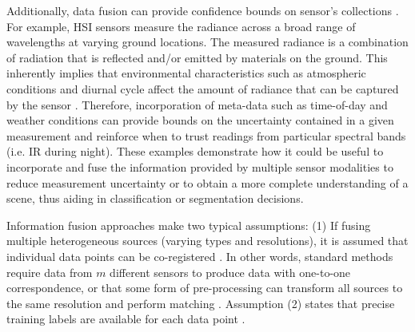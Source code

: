 	
	Additionally, data fusion can provide confidence bounds on sensor's collections \cite{hackett1990multisensorfusion,Mohandes2018ClassifierCombinationTechniquesReview}.  For example, HSI sensors measure the radiance across a broad range of wavelengths at varying ground locations.  The measured radiance is a combination of radiation that is reflected and/or emitted by materials on the ground.  This inherently implies that environmental characteristics such as atmospheric conditions and diurnal cycle affect the amount of radiance that can be captured by the sensor \cite{Zare2008Thesis}.  Therefore, incorporation of meta-data such as time-of-day and weather conditions can provide bounds on the uncertainty contained in a given measurement and reinforce when to trust readings from particular spectral bands (i.e. IR during night).   These examples demonstrate how it could be useful to incorporate and fuse the information provided by multiple sensor modalities to reduce measurement uncertainty or to obtain a more complete understanding of a scene, thus aiding in classification or segmentation decisions.
	\newline
	
	Information fusion approaches make two typical assumptions: (1) If fusing multiple heterogeneous sources (varying types and resolutions), it is assumed that individual data points can be co-registered \cite{Shen2016SpatioTemporalSpectralFusion}. In other words, standard methods require data from $m$ different sensors to produce data with one-to-one correspondence, or that some form of pre-processing can transform all sources to the same resolution and perform matching \cite{hackett1990multisensorfusion,Butenuth2007HeterogeneousGeospatialData}.  Assumption (2) states that precise training labels are available for each data point \cite{Du2017Thesis}. 
	\newline 
	
